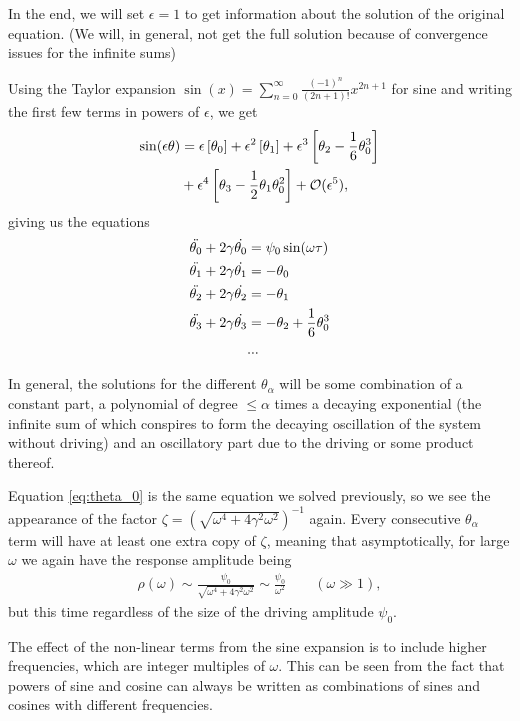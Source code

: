 \documentclass[10pt,a4paper,twocolumn]{article}
\begin{document}
In the end, we will set $\epsilon = 1$ to get information about the solution of the original equation. (We will, in general, not get the full solution because of convergence issues for the infinite sums)

Using the Taylor expansion $\sin(x) = \sum_{n=0}^{\infty} \frac{(-1)^n}{(2n+1)!} x^{2n+1}$ for sine and writing the first few terms in powers of $\epsilon$, we get
%
\begin{align}
\sin(\epsilon \theta) &= \epsilon \left[\theta_0\right] + \epsilon^2 \left[\theta_1\right] + \epsilon^3 \left[\theta_2 - \frac{1}{6} \theta_0^3\right]\notag\\ &+ \epsilon^4 \left[\theta_3 - \frac{1}{2}\theta_1\theta_0^2\right] + \mathcal{O}(\epsilon^5),
\end{align}
%
giving us the equations
%
\begin{align}
\ddot{\theta_0} + 2\gamma \dot{\theta_0} &= \psi_0 \sin(\omega \tau) \label{eq:theta_0}\\
\ddot{\theta_1} + 2\gamma \dot{\theta_1} &= -\theta_0 \\
\ddot{\theta_2} + 2\gamma \dot{\theta_2} &= -\theta_1 \\
\ddot{\theta_3} + 2\gamma \dot{\theta_3} &= -\theta_2 + \frac{1}{6}\theta_0^3 \\
&...\notag
\end{align}

In general, the solutions for the different $\theta_{\alpha}$ will be some combination of a constant part, a polynomial of degree $\leq \alpha$ times a decaying exponential (the infinite sum of which conspires to form the decaying oscillation of the system without driving) and an oscillatory part due to the driving or some product thereof.

Equation \ref{eq:theta_0} is the same equation we solved previously, so we see the appearance of the factor $\zeta = \left(\sqrt{\omega^4 + 4 \gamma^2 \omega^2}\right)^{-1}$ again. Every consecutive $\theta_{\alpha}$ term will have at least one extra copy of $\zeta$, meaning that asymptotically, for large $\omega$ we again have the response amplitude being
%
\begin{align}
\rho(\omega) \sim \frac{\psi_0}{\sqrt{\omega^4 + 4 \gamma^2 \omega^2}} \sim \frac{\psi_0}{\omega^2} \quad \quad (\omega \gg 1),
\end{align}
%
but this time regardless of the size of the driving amplitude $\psi_0$.

The effect of the non-linear terms from the sine expansion is to include higher frequencies, which are integer multiples of $\omega$. This can be seen from the fact that powers of sine and cosine can always be written as combinations of sines and cosines with different frequencies.
\end{document}
